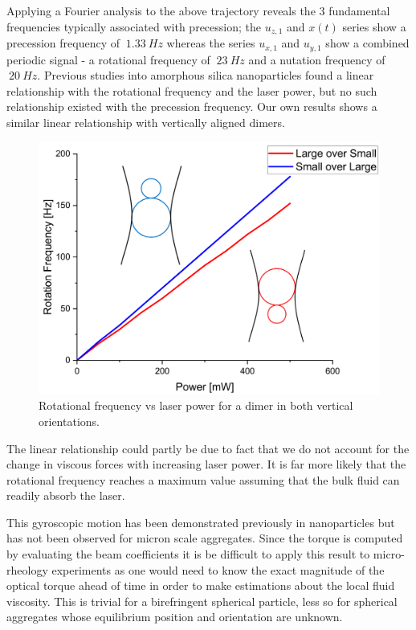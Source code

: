 Applying a Fourier analysis to the above trajectory reveals the 3
fundamental frequencies typically associated with precession; 
the $u_{z,1}$ and $x(t)$ series show a precession frequency of
$~1.33\ Hz$ whereas the series $u_{x,1}$ and $u_{y,1}$ show a 
combined periodic signal - a rotational frequency of $~23\ Hz$
and a nutation frequency of $~20\ Hz$. Previous studies into 
amorphous silica nanoparticles found a linear relationship 
with the rotational frequency and the laser power, but no such
relationship existed with the precession frequency. Our own 
results shows a similar linear relationship with vertically
aligned dimers.
\begin{figure}
	\includegraphics[width=\linewidth]{RotationvsPower.png}
	\caption{Rotational frequency vs laser power for a dimer in both vertical orientations.}
\end{figure}

The linear relationship could partly be due to fact that we do not
account for the change in viscous forces with increasing
laser power. It is far more likely that the rotational frequency
reaches a maximum value assuming that the bulk fluid can readily 
absorb the laser.

This gyroscopic motion has been demonstrated previously 
in nanoparticles \cite{Zhu2021, Rashid2018, Hoang2016, Kuhn2016} 
but has not been observed for micron scale aggregates. 
Since the torque is computed by evaluating the beam coefficients 
it is be difficult to apply this result to micro-rheology 
experiments as one would need to know the exact magnitude 
of the optical torque ahead of time in order to make 
estimations about the local fluid viscosity. This is 
trivial for a birefringent spherical particle, less 
so for spherical aggregates whose equilibrium position and 
orientation are unknown.


